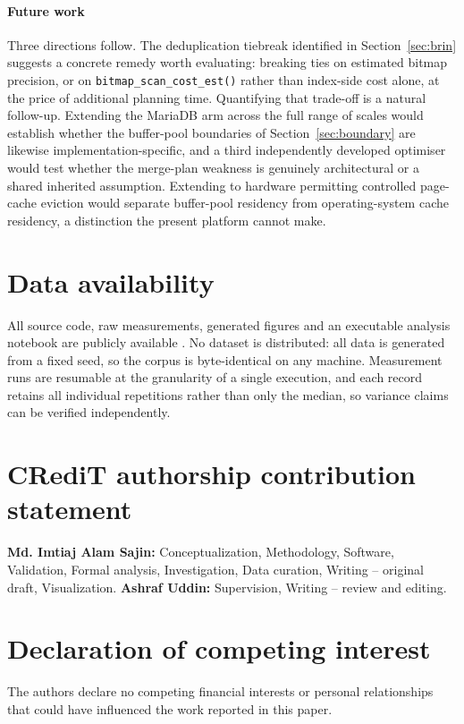 \documentclass[preprint,12pt,authoryear]{elsarticle}
\begin{document}
\paragraph{Future work}
Three directions follow. The deduplication tiebreak identified in
Section~\ref{sec:brin} suggests a concrete remedy worth evaluating:
breaking ties on estimated bitmap precision, or on
\texttt{bitmap\_scan\_cost\_est()} rather than index-side cost alone,
at the price of additional planning time. Quantifying that trade-off is
a natural follow-up. Extending the MariaDB arm across the full range of
scales would establish whether the buffer-pool boundaries of
Section~\ref{sec:boundary} are likewise implementation-specific, and a
third independently developed optimiser would test whether the
merge-plan weakness is genuinely architectural or a shared inherited
assumption. Extending to hardware permitting
controlled page-cache eviction would separate buffer-pool residency
from operating-system cache residency, a distinction the present
platform cannot make.

\section*{Data availability}
All source code, raw measurements, generated figures and an executable
analysis notebook are publicly available \citep{artifact2026}. No
dataset is distributed: all data is generated from a fixed seed, so the
corpus is byte-identical on any machine. Measurement runs are resumable
at the granularity of a single execution, and each record retains all
individual repetitions rather than only the median, so variance claims
can be verified independently.

\section*{CRediT authorship contribution statement}
\textbf{Md. Imtiaj Alam Sajin:} Conceptualization, Methodology,
Software, Validation, Formal analysis, Investigation, Data curation,
Writing -- original draft, Visualization.
\textbf{Ashraf Uddin:} Supervision, Writing -- review and editing.

\section*{Declaration of competing interest}
The authors declare no competing financial interests or personal
relationships that could have influenced the work reported in this
paper.



\end{document}
